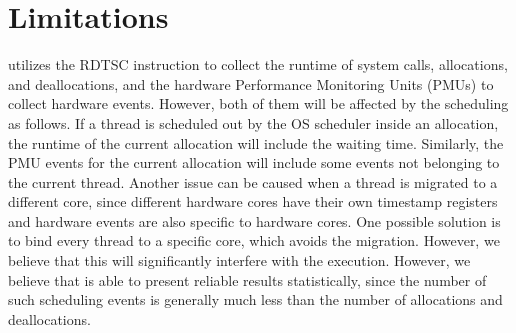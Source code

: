 \section{Limitations}

\label{sec:limitation}

\MP{} utilizes the RDTSC instruction to collect the runtime of system calls, allocations, and deallocations, and the hardware Performance Monitoring Units (PMUs) to collect hardware events. However, both of them will be affected by the scheduling as follows. If a thread is scheduled out by the OS scheduler inside an allocation, the runtime of the current allocation will include the waiting time. Similarly, the PMU events for the current allocation will  include some events not belonging to the current thread. Another issue can be caused when a thread is migrated to a different core, since different hardware cores have their own timestamp registers and hardware events are also specific to hardware cores.  One possible solution is to bind every thread to a specific core, which avoids the migration. However, we believe that this will significantly interfere with the execution. However, we believe that \MP{} is able to present reliable results statistically, since the number of such scheduling events is generally much less than the number of allocations and deallocations.   

